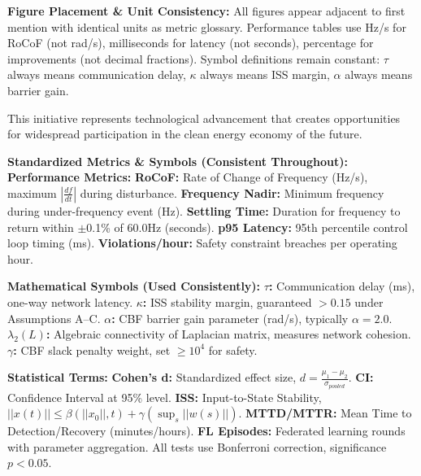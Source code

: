 \documentclass[12pt]{article}
\begin{document}
\textbf{Figure Placement \& Unit Consistency:} All figures appear adjacent to first mention with identical units as metric glossary. Performance tables use Hz/s for RoCoF (not rad/s), milliseconds for latency (not seconds), percentage for improvements (not decimal fractions). Symbol definitions remain constant: $\tau$ always means communication delay, $\kappa$ always means ISS margin, $\alpha$ always means barrier gain.

This initiative represents technological advancement that creates opportunities for widespread participation in the clean energy economy of the future.

\textbf{Standardized Metrics \& Symbols (Consistent Throughout):}
\textbf{Performance Metrics:} \textbf{RoCoF:} Rate of Change of Frequency (Hz/s), maximum $|\frac{df}{dt}|$ during disturbance. \textbf{Frequency Nadir:} Minimum frequency during under-frequency event (Hz). \textbf{Settling Time:} Duration for frequency to return within $\pm$0.1\% of 60.0Hz (seconds). \textbf{p95 Latency:} 95th percentile control loop timing (ms). \textbf{Violations/hour:} Safety constraint breaches per operating hour.

\textbf{Mathematical Symbols (Used Consistently):} \textbf{$\tau$:} Communication delay (ms), one-way network latency. \textbf{$\kappa$:} ISS stability margin, guaranteed $>0.15$ under Assumptions A--C. \textbf{$\alpha$:} CBF barrier gain parameter (rad/s), typically $\alpha=2.0$. \textbf{$\lambda_2(L)$:} Algebraic connectivity of Laplacian matrix, measures network cohesion. \textbf{$\gamma$:} CBF slack penalty weight, set $\geq 10^4$ for safety.

\textbf{Statistical Terms:} \textbf{Cohen's d:} Standardized effect size, $d = \frac{\mu_1-\mu_2}{\sigma_{pooled}}$. \textbf{CI:} Confidence Interval at 95\% level. \textbf{ISS:} Input-to-State Stability, $||x(t)|| \leq \beta(||x_0||,t) + \gamma(\sup_s ||w(s)||)$. \textbf{MTTD/MTTR:} Mean Time to Detection/Recovery (minutes/hours). \textbf{FL Episodes:} Federated learning rounds with parameter aggregation. All tests use Bonferroni correction, significance $p<0.05$.



\end{document}

